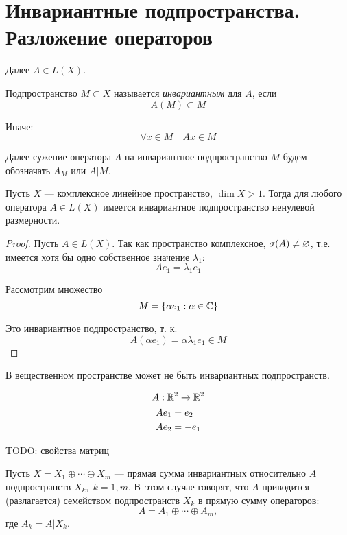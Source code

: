 \section{Инвариантные подпространства. Разложение операторов}
Далее $A \in L(X)$.

\begin{definition}
    Подпространство $ M \subset X $ называется \emph{инвариантным} для $A$, если
    \[ A(M) \subset M \]

    Иначе:
    \[ \forall x \in M \quad Ax \in M \]
\end{definition}

Далее сужение оператора $A$ на инвариантное подпространство $M$ будем обозначать
$A_M$ или $A \vert M $.

\begin{theorem} \label{th:invariantexists}
    Пусть $X$ — комплексное линейное пространство, $\dim X > 1$. Тогда для
    любого оператора $A \in L(X)$ имеется инвариантное подпространство ненулевой
    размерности.
\end{theorem}
\begin{proof}
    Пусть $A\in L(X)$. Так как пространство комплексное, $\operatorname{\sigma}(A) \neq
    \varnothing$, т.е. имеется хотя бы одно собственное значение $\lambda_1$:
    \[ Ae_1 = \lambda_1 e_1 \]
    
    Рассмотрим множество
    \[ M = \left\{ \alpha e_1 : \alpha \in \mathbb{C} \right\} \]

    Это инвариантное подпространство, т. к.
    \[  A(\alpha e_1) = \alpha \lambda_1 e_1 \in M \]
\end{proof}

В вещественном пространстве может не быть инвариантных подпространств.
\begin{example}
    \begin{gather*}
        A : \mathbb{R}^2 \to \mathbb{R}^2 \\  
        \begin{aligned}
            A e_1 &= e_2 \\
            A e_2 &= -e_1
        \end{aligned}
    \end{gather*}
\end{example}

TODO: свойства матриц

\begin{definition}
    Пусть $X = X_1 \oplus \dotsb \oplus X_m$ — прямая сумма инвариантных
    относительно $A$ подпространств $X_k, \; k = \overline{1,m}$. В~этом 
    случае говорят, что $A$ приводится (разлагается) семейством
    подпространств $X_k$ в прямую сумму операторов:
    \[ A = A_1 \oplus \dotsb \oplus A_m, \]
    где $A_k = A \vert X_k$.
\end{definition}

